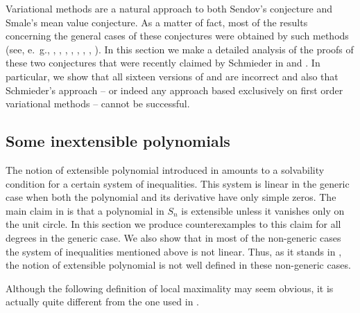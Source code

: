\documentclass[10pt,twoside,a4paper,reqno]{amsart}
\theoremstyle{plain}
\theoremstyle{definition}
\begin{document}
{Variational methods are a natural approach to both Sendov's conjecture and 
Smale's mean value conjecture. As a matter of fact, most of the results 
concerning the general cases of these conjectures were obtained by such 
methods (see, e.~g., \cite{B}, \cite{M1}, \cite{M2}, \cite{M3}, \cite{SSz}, 
\cite{Ti}, \cite{Ty}, \cite{VZ}). In this section we make a detailed analysis 
of the proofs of these two conjectures that were recently claimed by 
Schmieder in \cite{S1} and \cite{S2}. In particular, we show that all sixteen 
versions of \cite{S1} and \cite{S2} are incorrect and also that Schmieder's 
approach -- or indeed any approach based exclusively on first order 
variational methods -- cannot be successful.

\subsection{Some inextensible polynomials}

The notion of extensible polynomial introduced in \cite[v1-v2]{S1} amounts 
to a solvability condition for a certain system of inequalities. This system 
is linear in the generic case 
when both the polynomial and its derivative have only simple zeros. The main 
claim in \cite[v1-v2]{S1} is that a polynomial in $S_{n}$ is extensible 
unless it vanishes only on the 
unit circle. In this section we produce counterexamples to this claim for 
all degrees in the 
generic case. We also show that in most of the non-generic cases the system 
of inequalities 
mentioned above is not linear. Thus, as it stands in \cite[v1-v2]{S1}, 
the notion of extensible polynomial is not well defined in these non-generic 
cases.

Although the following definition of local maximality may seem obvious, it 
is actually quite different from the one used in \cite{S1}.

}
\end{document}
